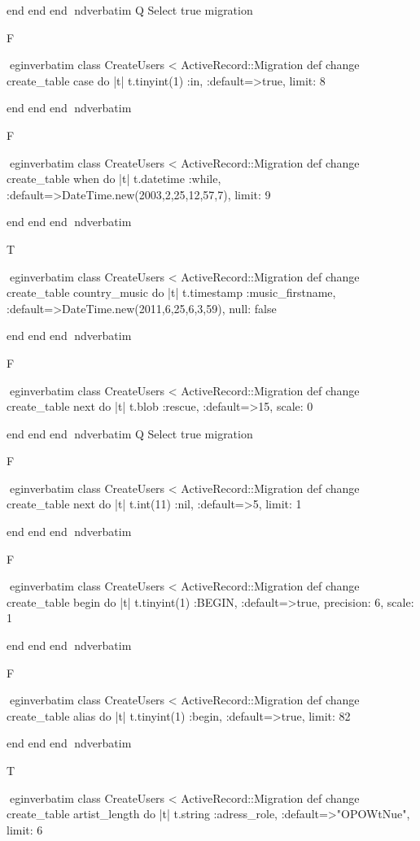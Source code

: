     end 
  end 
end
nd{verbatim}
Q
 Select true migration

F

egin{verbatim}
 class CreateUsers < ActiveRecord::Migration 
  def change 
    create_table case do |t| 
      t.tinyint(1) :in, :default=>true, limit: 8
    
    end 
  end 
end
nd{verbatim}

F

egin{verbatim}
 class CreateUsers < ActiveRecord::Migration 
  def change 
    create_table when do |t| 
      t.datetime :while, :default=>DateTime.new(2003,2,25,12,57,7), limit: 9
    
    end 
  end 
end
nd{verbatim}

T

egin{verbatim}
 class CreateUsers < ActiveRecord::Migration 
  def change 
    create_table country_music do |t| 
      t.timestamp :music_firstname, :default=>DateTime.new(2011,6,25,6,3,59), null: false
    
    end 
  end 
end
nd{verbatim}

F

egin{verbatim}
 class CreateUsers < ActiveRecord::Migration 
  def change 
    create_table next do |t| 
      t.blob :rescue, :default=>15, scale: 0
    
    end 
  end 
end
nd{verbatim}
Q
 Select true migration

F

egin{verbatim}
 class CreateUsers < ActiveRecord::Migration 
  def change 
    create_table next do |t| 
      t.int(11) :nil, :default=>5, limit: 1
    
    end 
  end 
end
nd{verbatim}

F

egin{verbatim}
 class CreateUsers < ActiveRecord::Migration 
  def change 
    create_table begin do |t| 
      t.tinyint(1) :BEGIN, :default=>true, precision: 6, scale: 1
    
    end 
  end 
end
nd{verbatim}

F

egin{verbatim}
 class CreateUsers < ActiveRecord::Migration 
  def change 
    create_table alias do |t| 
      t.tinyint(1) :begin, :default=>true, limit: 82
    
    end 
  end 
end
nd{verbatim}

T

egin{verbatim}
 class CreateUsers < ActiveRecord::Migration 
  def change 
    create_table artist_length do |t| 
      t.string :adress_role, :default=>"OPOWtNue", limit: 6
    
